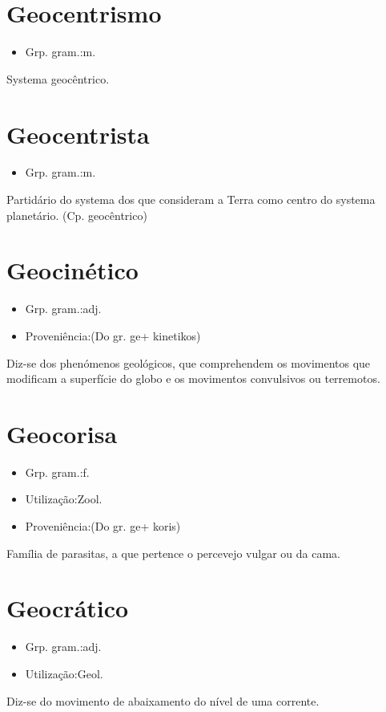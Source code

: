 \section{Geocentrismo}
\begin{itemize}
\item {Grp. gram.:m.}
\end{itemize}
Systema geocêntrico.
\section{Geocentrista}
\begin{itemize}
\item {Grp. gram.:m.}
\end{itemize}
Partidário do systema dos que consideram a Terra como centro do systema planetário. (Cp. \textunderscore geocêntrico\textunderscore )
\section{Geocinético}
\begin{itemize}
\item {Grp. gram.:adj.}
\end{itemize}
\begin{itemize}
\item {Proveniência:(Do gr. \textunderscore ge\textunderscore  + \textunderscore kinetikos\textunderscore )}
\end{itemize}
Diz-se dos phenómenos geológicos, que comprehendem os movimentos que modificam a superfície do globo e os movimentos convulsivos ou terremotos.
\section{Geocorisa}
\begin{itemize}
\item {Grp. gram.:f.}
\end{itemize}
\begin{itemize}
\item {Utilização:Zool.}
\end{itemize}
\begin{itemize}
\item {Proveniência:(Do gr. \textunderscore ge\textunderscore  + \textunderscore koris\textunderscore )}
\end{itemize}
Família de parasitas, a que pertence o percevejo vulgar ou da cama.
\section{Geocrático}
\begin{itemize}
\item {Grp. gram.:adj.}
\end{itemize}
\begin{itemize}
\item {Utilização:Geol.}
\end{itemize}
Diz-se do movimento de abaixamento do nível de uma corrente.
